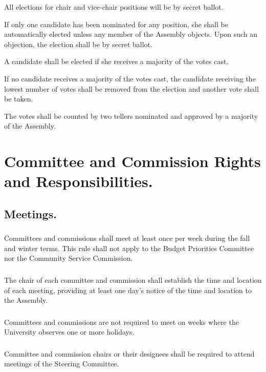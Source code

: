 \subsubsubsection{}
All elections for chair and vice-chair positions will be by secret ballot.  

\subsubsubsection{}
If only one candidate has been nominated for any position, she shall be automatically elected unless any member of the Assembly objects.  Upon such an objection, the election shall be by secret ballot.

\subsubsubsection{}
A candidate shall be elected if she receives a majority of the votes cast.

\subsubsubsection{}
If no candidate receives a majority of the votes cast, the candidate receiving the lowest number of votes shall be removed from the election and another vote shall be taken.

\subsubsubsection{}
The votes shall be counted by two tellers nominated and approved by a majority of the Assembly.


\section{Committee and Commission Rights and Responsibilities.}

\subsection{Meetings.}
 
\subsubsection{}
Committees and commissions shall meet at least once per week during the fall and winter terms.  This rule shall not apply to the Budget Priorities Committee nor the Community Service Commission.

\subsubsection{}
The chair of each committee and commission shall establish the time and location of each meeting, providing at least one day's notice of the time and location to the Assembly.

\subsubsection{}
Committees and commissions are not required to meet on weeks where the University observes one or more holidays.

\subsubsection{}
Committee and commission chairs or their designees shall be required to attend meetings of the Steering Committee.  

